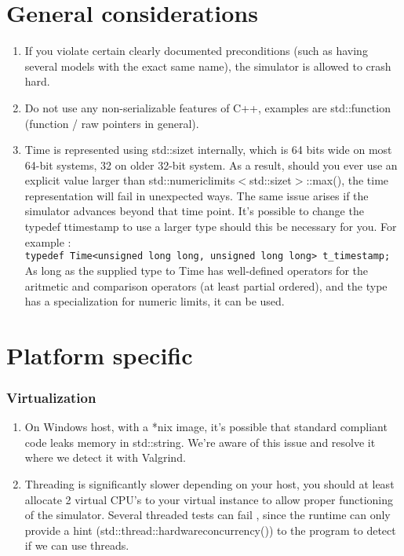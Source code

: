 \section{General considerations}
\begin{enumerate}
	\item If you violate certain clearly documented preconditions (such as having several models with the exact same name), the simulator is allowed to crash hard.
	\item Do not use any non-serializable features of C++, examples are std::function (function / raw pointers in general).
	\item Time is represented using std::size\textunderscore t internally, which is 64 bits wide on most 64-bit systems, 32 on older 32-bit system. As a result, should you ever use an explicit value larger than std::numeric\textunderscore limits$<$std::size\textunderscore t$>$::max(), the time representation will fail in unexpected ways. The same issue arises if the simulator advances beyond that time point. It's possible to change the typedef t\textunderscore timestamp to use a larger type should this be necessary for you. For example :\\
	\lstinline!typedef Time<unsigned long long, unsigned long long> t_timestamp;!
	As long as the supplied type to Time has well-defined operators for the aritmetic and comparison operators (at least partial ordered), and the type has a specialization for numeric limits, it can be used.
\end{enumerate}

\section{Platform specific}
\subsubsection{Virtualization}
\begin{enumerate}
\item On Windows host, with a *nix image, it's possible that standard compliant code leaks memory in std::string. We're aware of this issue and resolve it where we detect it with Valgrind.
\item Threading is significantly slower depending on your host, you should at least allocate 2 virtual CPU's to your virtual instance to allow proper functioning of the simulator. Several threaded tests can fail , since the runtime can only provide a hint (std::thread::hardware\textunderscore concurrency()) to the program to detect if we can use threads.
\end{enumerate}
